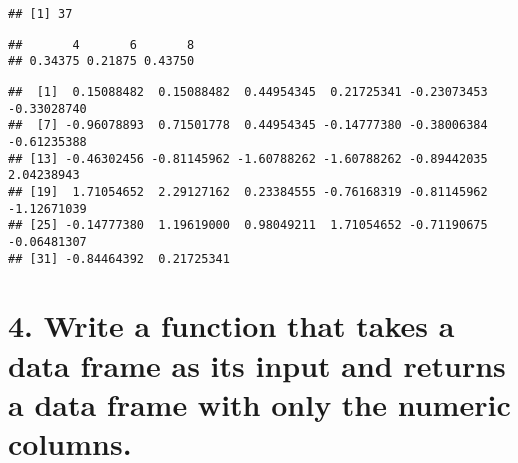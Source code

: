\documentclass[
]{article}
\newenvironment{Shaded}{\begin{snugshade}}{\end{snugshade}}
\newcommand{\CommentTok}[1]{\textcolor[rgb]{0.56,0.35,0.01}{\textit{#1}}}
\newcommand{\ControlFlowTok}[1]{\textcolor[rgb]{0.13,0.29,0.53}{\textbf{#1}}}
\newcommand{\DataTypeTok}[1]{\textcolor[rgb]{0.13,0.29,0.53}{#1}}
\newcommand{\KeywordTok}[1]{\textcolor[rgb]{0.13,0.29,0.53}{\textbf{#1}}}
\newcommand{\NormalTok}[1]{#1}
\newcommand{\OperatorTok}[1]{\textcolor[rgb]{0.81,0.36,0.00}{\textbf{#1}}}
\newcommand{\OtherTok}[1]{\textcolor[rgb]{0.56,0.35,0.01}{#1}}
\newcommand{\StringTok}[1]{\textcolor[rgb]{0.31,0.60,0.02}{#1}}
\begin{document}
\begin{verbatim}
## [1] 37
\end{verbatim}

\begin{Shaded}
\end{Shaded}

\begin{verbatim}
##       4       6       8 
## 0.34375 0.21875 0.43750
\end{verbatim}

\begin{Shaded}
\end{Shaded}

\begin{verbatim}
##  [1]  0.15088482  0.15088482  0.44954345  0.21725341 -0.23073453 -0.33028740
##  [7] -0.96078893  0.71501778  0.44954345 -0.14777380 -0.38006384 -0.61235388
## [13] -0.46302456 -0.81145962 -1.60788262 -1.60788262 -0.89442035  2.04238943
## [19]  1.71054652  2.29127162  0.23384555 -0.76168319 -0.81145962 -1.12671039
## [25] -0.14777380  1.19619000  0.98049211  1.71054652 -0.71190675 -0.06481307
## [31] -0.84464392  0.21725341
\end{verbatim}

\hypertarget{write-a-function-that-takes-a-data-frame-as-its-input-and-returns-a-data-frame-with-only-the-numeric-columns.}{%
\section{4. Write a function that takes a data frame as its input and
returns a data frame with only the numeric
columns.}\label{write-a-function-that-takes-a-data-frame-as-its-input-and-returns-a-data-frame-with-only-the-numeric-columns.}}
\end{document}

